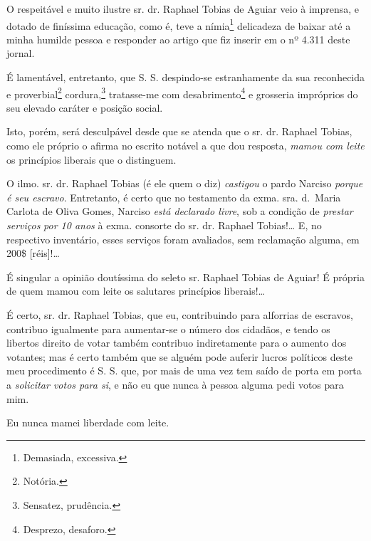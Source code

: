O respeitável e muito ilustre sr. dr. Raphael Tobias de Aguiar veio à
imprensa, e dotado de finíssima educação, como é, teve a
nímia\footnote{ Demasiada, excessiva.} delicadeza de baixar até a
minha humilde pessoa e responder ao artigo que fiz inserir em o nº 4.311
deste jornal.

É lamentável, entretanto, que S. S. despindo-se estranhamente da sua
reconhecida e proverbial\footnote{ Notória.} cordura,\footnote{
  Sensatez, prudência.} tratasse-me com desabrimento\footnote{
  Desprezo, desaforo.} e grosseria impróprios do seu elevado caráter e
posição social.

Isto, porém, será desculpável desde que se atenda que o sr. dr. Raphael
Tobias, como ele próprio o afirma no escrito notável a que dou resposta,
\emph{mamou com leite} os princípios liberais que o distinguem.

O ilmo. sr. dr. Raphael Tobias (é ele quem o diz) \emph{castigou} o
pardo Narciso \emph{porque é seu escravo}. Entretanto, é certo que no
testamento da exma. sra. d.~Maria Carlota de Oliva Gomes, Narciso
\emph{está declarado livre}, sob a condição de \emph{prestar serviços}
\emph{por 10 anos} à exma. consorte do sr. dr. Raphael Tobias!\ldots{} E, no
respectivo inventário, esses serviços foram avaliados, sem reclamação
alguma, em 200\$ {[}réis{]}!\ldots{}

É singular a opinião doutíssima do seleto sr. Raphael Tobias de Aguiar!
É própria de quem mamou com leite os salutares princípios
liberais!\ldots{}

É certo, sr. dr. Raphael Tobias, que eu, contribuindo para alforrias de
escravos, contribuo igualmente para aumentar-se o número dos cidadãos, e
tendo os libertos direito de votar também contribuo indiretamente para o
aumento dos votantes; mas é certo também que se alguém pode auferir
lucros políticos deste meu procedimento é S. S. que, por mais de uma vez
tem saído de porta em porta a \emph{solicitar votos para si}, e não eu
que nunca à pessoa alguma pedi votos para mim.

Eu nunca mamei liberdade com leite.

